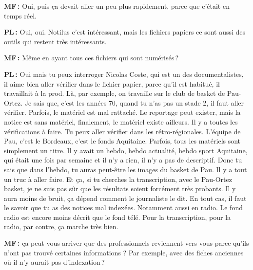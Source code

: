 \textbf{MF :} Oui, puis ça devait aller un peu plus rapidement, parce que c'était en temps réel.   

\textbf{PL :} Oui, oui. Notilus c'est intéressant, mais les fichiers papiers ce sont aussi des outils qui restent très intéressants. 

\textbf{MF :} Même en ayant tous ces fichiers qui sont numérisés ? 

\textbf{PL :} Oui mais tu peux interroger Nicolas Coste, qui est un des documentalistes, il aime bien aller vérifier dans le fichier papier, parce qu'il est habitué, il travaillait à la prod. Là, par exemple, on travaille sur le club de basket de Pau-Ortez. Je sais que, c’est les années 70, quand tu n'as pas un stade 2, il faut aller vérifier. Parfois, le matériel est mal rattaché. Le reportage peut exister, mais la notice est sans matériel, finalement, le matériel existe ailleurs. Il y a toutes les vérifications à faire. Tu peux aller vérifier dans les rétro-régionales. L'équipe de Pau, c'est le Bordeaux, c'est le fonds Aquitaine. Parfois, tous les matériels sont simplement un titre.  Il y avait un hebdo, hebdo actualité, hebdo sport Aquitaine, qui était une fois par semaine et il n'y a rien, il n'y a pas de descriptif.  Donc tu sais que dans l'hebdo, tu auras peut-être les images du basket de Pau. Il y a tout un truc à aller faire. Et ça, si tu cherches la transcription, avec le Pau-Ortez basket, je ne suis pas sûr que les résultats soient forcément très probants. Il y aura moins de bruit, ça dépend comment le journaliste le dit. En tout cas, il faut le savoir que tu as des notices mal indexées. Notamment aussi en radio. Le fond radio est encore moins décrit que le fond télé. Pour la transcription, pour la radio, par contre, ça marche très bien. 

\textbf{MF :} ça peut vous arriver que des professionnels reviennent vers vous parce qu'ils n'ont pas trouvé certaines informations ? Par exemple, avec des fiches anciennes où il n'y aurait pas d'indexation ? 

